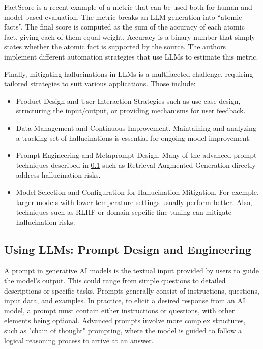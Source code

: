 \documentclass[conference]{IEEEtran}
\begin{document}
FactScore \cite{min2023factscore} is a recent example of a metric that can be used both for human and model-based evaluation. The metric breaks an LLM generation into “atomic facts”. The final score is computed as the sum of the accuracy of each atomic fact, giving each of them equal weight. Accuracy is a binary number that simply states whether the atomic fact is supported by the source. The authors implement different automation strategies that use LLMs to estimate this metric.

Finally, mitigating hallucinations in LLMs is a multifaceted challenge, requiring tailored strategies to suit various applications.  Those include:
\begin{itemize}
    \item Product Design and User Interaction Strategies such as use case design, structuring the input/output, or providing mechanisms for user feedback.
    \item Data Management and Continuous Improvement. Maintaining and analyzing a tracking set of hallucinations is essential for ongoing model improvement.
    \item Prompt Engineering and Metaprompt Design. Many of the advanced prompt techniques described in \ref{sub:Prompts} such as Retrieval Augmented Generation directly address hallucination risks.
    \item Model Selection and Configuration for Hallucination Mitigation. For exemple, larger models with lower temperature settings usually perform better. Also, techniques such as RLHF or domain-sepcific fine-tuning can mitigate hallucination risks.
\end{itemize}


\subsection{Using LLMs: \textbf{Prompt Design and Engineering}}\label{sub:Prompts}

A prompt in generative AI models is the textual input provided by users to guide the model's output. This could range from simple questions to detailed descriptions or specific tasks. Prompts generally consist of instructions, questions, input data, and examples. In practice, to elicit a desired response from an AI model, a prompt must contain either instructions or questions, with other elements being optional. Advanced prompts involve more complex structures, such as "chain of thought" prompting, where the model is guided to follow a logical reasoning process to arrive at an answer.
\end{document}
